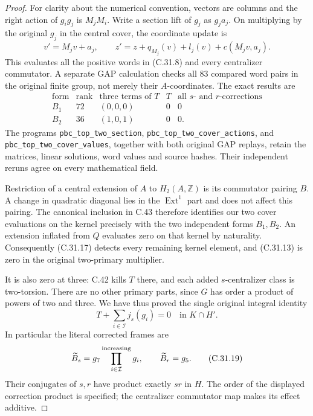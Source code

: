 \begin{proof}
For clarity about the numerical convention, vectors are columns
and the right action of $g_i g_j$ is $M_jM_i$. Write a section lift
of $g_j$ as $g_j a_j$. On multiplying by the original $g_j$ in the
central cover, the coordinate update is
\[
 v'=M_jv+a_j,\qquad
 z'=z+q_{M_j}(v)+l_j(v)+c(M_jv,a_j).
 \tag{C.31.16}
\]
This evaluates all the positive words in (C.31.8) and every
centralizer commutator. A separate GAP calculation checks all
$83$ compared word pairs in the original finite group, not merely
their $A$-coordinates. The exact results are
\[
\begin{array}{c|c|c|c|c}
 \text{form}&\text{rank}&\text{three terms of }T&T&
             \text{all }s\text{- and }r\text{-corrections}\\\hline
 B_1&72&(0,0,0)&0&0\\
 B_2&36&(1,0,1)&0&0.
\end{array}
 \tag{C.31.17}
\]
The programs \texttt{pbc\_top\_two\_section},
\texttt{pbc\_top\_two\_cover\_actions}, and
\texttt{pbc\_top\_two\_cover\_values}, together with both original
GAP replays, retain the matrices, linear solutions, word values and
source hashes. Their independent reruns agree on every mathematical
field.

Restriction of a central extension of $A$ to $H_2(A,\mathbb Z)$
is its commutator pairing $B$. A change in quadratic diagonal lies
in the $\operatorname{Ext}^1$ part and does not affect this pairing.
The canonical inclusion in C.43 therefore identifies our two
cover evaluations on the kernel precisely with the two independent
forms $B_1,B_2$. An extension inflated from $Q$ evaluates zero on
that kernel by naturality. Consequently (C.31.17) detects every
remaining kernel element, and (C.31.13) is zero in the original
two-primary multiplier.

It is also zero at three: C.42 kills $T$ there, and each added
$s$-centralizer class is two-torsion. There are no other primary
parts, since $G$ has order a product of powers of two and three.
We have thus proved the single original integral identity
\[
                    T+\sum_{i\in\mathcal I}j_s(g_i)=0
                         \quad\text{in }K\cap H'.
 \tag{C.31.18}
\]
In particular the literal corrected frames are
\[
        \widetilde B_s=g_7\prod_{i\in\mathcal I}^{\rm increasing}g_i,
        \qquad \widetilde B_r=g_5.
 \tag{C.31.19}
\]
Their conjugates of $s,r$ have product exactly $sr$ in $H$.
The order of the displayed correction product is specified; the
centralizer commutator map makes its effect additive.


\end{proof}
